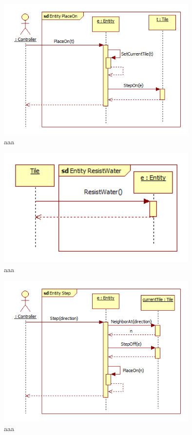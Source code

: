 \begin{figure}[H]
        \begin{center}
                \includegraphics[width=10cm]{chapters/chapter07/seqdiag/Entity_PlaceOn.png}
                \caption{aaa}
                \label{bbb}
        \end{center}
\end{figure}
\begin{figure}[H]
        \begin{center}
                \includegraphics[width=10cm]{chapters/chapter07/seqdiag/Entity_ResistWater.png}
                \caption{aaa}
                \label{bbb}
        \end{center}
\end{figure}
\begin{figure}[H]
        \begin{center}
                \includegraphics[width=10cm]{chapters/chapter07/seqdiag/Entity_Step.png}
                \caption{aaa}
                \label{bbb}
        \end{center}
\end{figure}
